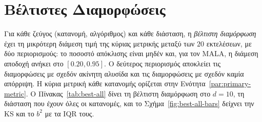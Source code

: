 \section{Βέλτιστες Διαμορφώσεις}
\label{sec:grid-study}

Για κάθε ζεύγος (κατανομή, αλγόριθμος) και κάθε διάσταση, η \emph{βέλτιστη
διαμόρφωση} έχει τη μικρότερη διάμεση τιμή της κύριας μετρικής μεταξύ
των $20$ εκτελέσεων, με δύο περιορισμούς: το ποσοστό απόκλισης είναι μηδέν
και, για τον MALA, η διάμεση αποδοχή ανήκει στο $[0.20, 0.95]$. Ο δεύτερος
περιορισμός αποκλείει τις διαμορφώσεις με σχεδόν ακίνητη αλυσίδα και τις
διαμορφώσεις με σχεδόν καμία απόρριψη. Η κύρια μετρική κάθε κατανομής ορίζεται στην
Ενότητα~\ref{par:primary-metric}. Ο Πίνακας~\ref{tab:best-all} δίνει τη βέλτιστη
διαμόρφωση στο $d=10$, τη διάσταση που έχουν όλες οι κατανομές, και το
Σχήμα~\ref{fig:best-all-bars} δείχνει την KS και το $b^2$ με τα IQR τους.

